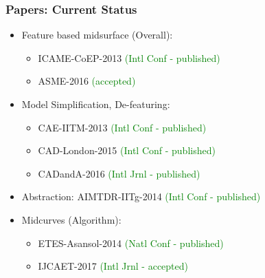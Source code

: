 \begin{frame}
\frametitle{Papers: Current Status}
\vspace{-0.5cm}
\begin{itemize}[noitemsep,label=\textbullet, topsep=2pt,parsep=2pt,partopsep=2pt]
\item  Feature based midsurface (Overall):
	\begin{itemize}
	\item  ICAME-CoEP-2013 \textcolor{green}{(Intl Conf - published)}
	\item ASME-2016  \textcolor{green}{(accepted)}
	\end{itemize}
\item  Model Simplification, De-featuring:
	\begin{itemize}
	\item  CAE-IITM-2013 \textcolor{green}{(Intl Conf - published)}
	\item  CAD-London-2015 \textcolor{green}{(Intl Conf - published)}	
	\item  CADandA-2016 \textcolor{green}{(Intl Jrnl - published)}	
	\end{itemize}	
\item   Abstraction:  AIMTDR-IITg-2014 \textcolor{green}{(Intl Conf - published)}
\item  Midcurves (Algorithm): 
	\begin{itemize}
	\item  ETES-Asansol-2014 \textcolor{green}{(Natl Conf - published)}
	\item  IJCAET-2017 \textcolor{green}{(Intl Jrnl - accepted)}
	\end{itemize}		

\end{itemize}
\end{frame}
